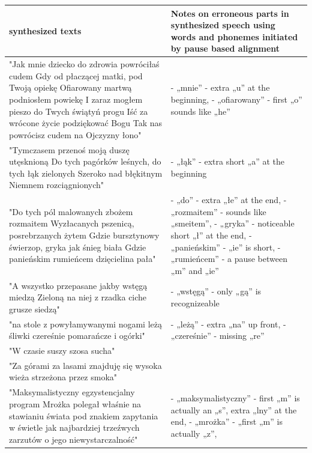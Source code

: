 \documentclass[12pt,a4paper,english]{article}
\begin{document}
\begin{center}
\begin{tabular}{| p{8cm} | p{8cm} |}
\hline
\cellcolor[gray]{0.8}
synthesized texts &
\cellcolor[gray]{0.8}
Notes on erroneous parts in synthesized speech using words and phonemes initiated by pause based alignment
\\ \hline
"Jak mnie dziecko do zdrowia powróciłaś cudem Gdy od płaczącej matki, pod Twoją opiekę Ofiarowany martwą podniosłem powiekę I zaraz mogłem pieszo do Twych świątyń progu Iść za wrócone życie podziękować Bogu Tak nas powrócisz cudem na Ojczyzny łono" &
- „mnie” - extra „u” at the beginning, \newline
- „ofiarowany” - first „o” sounds like „he”
\\ \hline
"Tymczasem przenoś moją duszę utęsknioną Do tych pagórków leśnych, do tych łąk zielonych Szeroko nad błękitnym Niemnem rozciągnionych" &
- „łąk” - extra short „a” at the beginning
\\ \hline
"Do tych pól malowanych zbożem rozmaitem Wyzłacanych pszenicą, posrebrzanych żytem Gdzie bursztynowy świerzop, gryka jak śnieg biała Gdzie panieńskim rumieńcem dzięcielina pała" &
- „do” - extra „łe” at the end, \newline
- „rozmaitem” - sounds like „smeitem”, \newline
- „gryka” - noticeable short „ł” at the end, \newline
- „panieńskim” - „ie” is short, \newline
- „rumieńcem” - a pause between „m” and „ie”
\\ \hline
"A wszystko przepasane jakby wstęgą miedzą Zieloną na niej z rzadka ciche grusze siedzą" &
- „wstęgą” - only „gą” is recognizeable
\\ \hline
"na stole z powyłamywanymi nogami leżą śliwki czereśnie pomarańcze i ogórki" &
- „leżą” - extra „na” up front, \newline
- „czereśnie” - missing „re”
\\ \hline
"W czasie suszy szosa sucha" &
\\ \hline
"Za górami za lasami znajduję się wysoka wieża strzeżona przez smoka" &
\\ \hline
"Maksymalistyczny egzystencjalny program Mrożka polegał właśnie na stawianiu świata pod znakiem zapytania w świetle jak najbardziej trzeźwych zarzutów o jego niewystarczalność" &
- „maksymalistyczny” - first „m” is actually an „s”, extra „lny” at the end, \newline
- „mrożka” - „first „m” is actually „z”, \newline

\end{tabular}
\end{center}
\end{document}
